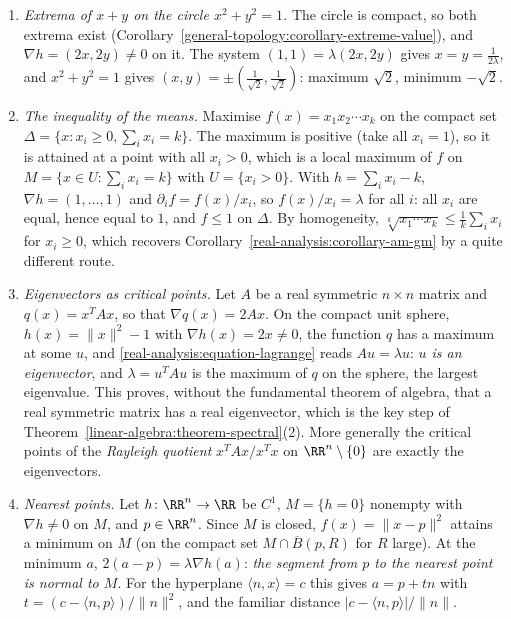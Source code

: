 \begin{example}\label{real-analysis:example-lagrange}
\begin{enumerate}
\item \emph{Extrema of $x + y$ on the circle $x^2 + y^2 = 1$.} The circle is compact, so both extrema exist (Corollary~\ref{general-topology:corollary-extreme-value}), and $\nabla h = (2x, 2y) \neq 0$ on it.
The system $(1, 1) = \lambda(2x, 2y)$ gives $x = y = \frac1{2\lambda}$, and $x^2 + y^2 = 1$ gives $(x, y) = \pm(\frac1{\sqrt2}, \frac1{\sqrt2})$: maximum $\sqrt2$, minimum $-\sqrt2$.
\item \emph{The inequality of the means.} Maximise $f(x) = x_1x_2\cdots x_k$ on the compact set $\Delta = \{x : x_i \geq 0, \sum_ix_i = k\}$. The maximum is positive (take all $x_i = 1$), so it is attained at a
point with all $x_i > 0$, which is a local maximum of $f$ on $M = \{x \in U : \sum_ix_i = k\}$ with $U = \{x_i > 0\}$. With $h = \sum_ix_i - k$, $\nabla h = (1, \ldots, 1)$ and
$\partial_if = f(x)/x_i$, so $f(x)/x_i = \lambda$ for all $i$: all $x_i$ are equal, hence equal to $1$, and $f \leq 1$ on $\Delta$. By homogeneity, $\sqrt[k]{x_1\cdots x_k} \leq \frac1k\sum_ix_i$ for $x_i \geq 0$,
which recovers Corollary~\ref{real-analysis:corollary-am-gm} by a quite different route.
\item \emph{Eigenvectors as critical points.} Let $A$ be a real symmetric $n \times n$ matrix and $q(x) = x^TAx$, so that $\nabla q(x) = 2Ax$. On the compact unit sphere, $h(x) = \|x\|^2 - 1$ with
$\nabla h(x) = 2x \neq 0$, the function $q$ has a maximum at some $u$, and \eqref{real-analysis:equation-lagrange} reads $Au = \lambda u$: \emph{$u$ is an eigenvector}, and $\lambda = u^TAu$ is the maximum
of $q$ on the sphere, the largest eigenvalue. This proves, without the fundamental theorem of algebra, that a real symmetric matrix has a real eigenvector, which is the key step of
Theorem~\ref{linear-algebra:theorem-spectral}(2). More generally the critical points of the \emph{Rayleigh quotient} $x^TAx/x^Tx$ on $\RR^n \setminus \{0\}$ are exactly the eigenvectors.
\item \emph{Nearest points.} Let $h \colon \RR^n \to \RR$ be $C^1$, $M = \{h = 0\}$ nonempty with $\nabla h \neq 0$ on $M$, and $p \in \RR^n$. Since $M$ is closed, $f(x) = \|x - p\|^2$ attains a minimum on
$M$ (on the compact set $M \cap \overline{B}(p, R)$ for $R$ large). At the minimum $a$, $2(a - p) = \lambda\nabla h(a)$: \emph{the segment from $p$ to the nearest point is normal to $M$}. For the hyperplane
$\langle n, x\rangle = c$ this gives $a = p + tn$ with $t = (c - \langle n, p\rangle)/\|n\|^2$, and the familiar distance $|c - \langle n, p\rangle|/\|n\|$.
\end{enumerate}
\end{example}

